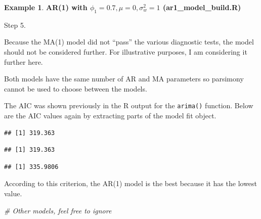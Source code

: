 \documentclass[
]{book}
\newenvironment{Shaded}{\begin{snugshade}}{\end{snugshade}}
\newcommand{\CommentTok}[1]{\textcolor[rgb]{0.56,0.35,0.01}{\textit{#1}}}
\newcommand{\DecValTok}[1]{\textcolor[rgb]{0.00,0.00,0.81}{#1}}
\newcommand{\NormalTok}[1]{#1}
\newcommand{\SpecialCharTok}[1]{\textcolor[rgb]{0.00,0.00,0.00}{#1}}
\theoremstyle{definition}
\theoremstyle{definition}
\newtheorem{example}{Example}[chapter]
\theoremstyle{definition}
\theoremstyle{definition}
\theoremstyle{remark}
\begin{document}
\begin{example}

\textbf{AR(1) with \(\phi_1=0.7, \mu=0, \sigma_w^2=1\) (ar1\_model\_build.R)}

Step 5.

Because the MA(1) model did not ``pass'' the various diagnostic tests, the model should not be considered further. For illustrative purposes, I am considering it further here.

Both models have the same number of AR and MA parameters so parsimony cannot be used to choose between the models.

The AIC was shown previously in the R output for the \texttt{arima()} function. Below are the AIC values again by extracting parts of the model fit object.

\begin{Shaded}
\end{Shaded}

\begin{verbatim}
## [1] 319.363
\end{verbatim}

\begin{Shaded}
\end{Shaded}

\begin{verbatim}
## [1] 319.363
\end{verbatim}

\begin{Shaded}
\end{Shaded}

\begin{verbatim}
## [1] 335.9806
\end{verbatim}

According to this criterion, the AR(1) model is the best because it has the lowest value.

\begin{Shaded}
\begin{Highlighting}[]
\CommentTok{\# Other models, feel free to ignore}


\end{Highlighting}
\end{Shaded}
\end{example}
\end{document}
